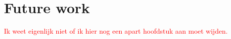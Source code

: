 \chapter{Future work}

\textcolor{red}{Ik weet eigenlijk niet of ik hier nog een apart hoofdstuk aan moet wijden.}